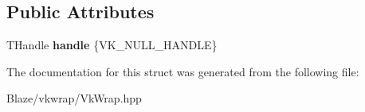 \subsection*{Public Attributes}
\begin{DoxyCompactItemize}
\item 
\mbox{\label{structblaze_1_1vkw_1_1IndependentHolder_a452fcee08fa627d1f90900b62c6f900a}} 
T\+Handle {\bfseries handle} \{V\+K\+\_\+\+N\+U\+L\+L\+\_\+\+H\+A\+N\+D\+LE\}
\end{DoxyCompactItemize}


The documentation for this struct was generated from the following file\+:\begin{DoxyCompactItemize}
\item 
Blaze/vkwrap/Vk\+Wrap.\+hpp\end{DoxyCompactItemize}
